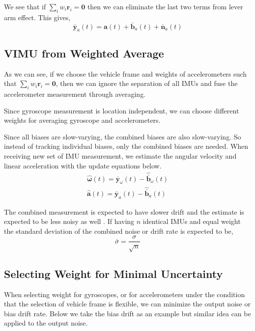 \documentclass[conference]{IEEEtran}
\begin{document}
We see that if $\sum_i{w_i \textbf{r}_i} = \textbf{0}$ then we can eliminate the last two terms from lever arm effect. This gives,
\begin{equation}
    \bar{\textbf{y}}_a(t) = \textbf{a}(t) + \bar{\textbf{b}}_a(t) + \bar{\textbf{n}}_a(t)
\end{equation}

\subsection{VIMU from Weighted Average}\label{AA}

As we can see, if we choose the vehicle frame and weights of accelerometers such that $\sum_i{w_i \textbf{r}_i} = \textbf{0}$, then we can ignore the separation of all IMUs and fuse the accelerometer measurement through averaging.

Since gyroscope measurement is location independent, we can choose different weights for averaging gyroscope and accelerometers.

Since all biases are slow-varying, the combined biases are also slow-varying. So instead of tracking individual biases, only the combined biases are needed. When receiving new set of IMU measurement, we estimate the angular velocity and linear acceleration with the update equations below.
\begin{equation}
\begin{split}
    \hat{\bm{\omega}}(t) = \bar{\textbf{y}}_\omega(t) - \hat{\bar{\textbf{b}}}_\omega(t) \\
    \hat{\textbf{a}}(t)  = \bar{\textbf{y}}_a(t) - \hat{\bar{\textbf{b}}}_a(t)
\end{split}
\end{equation}

The combined measurement is expected to have slower drift and the estimate is expected to be less noisy as well \cite{patel2022_multi-imu}. If having $n$ identical IMUs and equal weight the standard deviation of the combined noise or drift rate is expected to be,
\begin{equation}
    \bar{\sigma} = \frac{\sigma}{\sqrt{n}}
\end{equation}

\subsection{Selecting Weight for Minimal Uncertainty}\label{solve_weight_by_noise}

When selecting weight for gyroscopes, or for accelerometers under the condition that the selection of vehicle frame is flexible, we can minimize the output noise or bias drift rate. Below we take the bias drift as an example but similar idea can be applied to the output noise.
\end{document}
